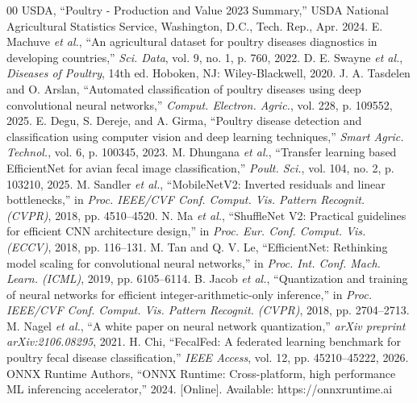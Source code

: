 \documentclass[11pt,a4paper]{article}
\begin{document}
\begin{thebibliography}{00}
 USDA, ``Poultry - Production and Value 2023 Summary,'' USDA National Agricultural Statistics Service, Washington, D.C., Tech. Rep., Apr. 2024.
 E. Machuve \textit{et al.}, ``An agricultural dataset for poultry diseases diagnostics in developing countries,'' \textit{Sci. Data}, vol. 9, no. 1, p. 760, 2022.
 D. E. Swayne \textit{et al.}, \textit{Diseases of Poultry}, 14th ed. Hoboken, NJ: Wiley-Blackwell, 2020.
 J. A. Tasdelen and O. Arslan, ``Automated classification of poultry diseases using deep convolutional neural networks,'' \textit{Comput. Electron. Agric.}, vol. 228, p. 109552, 2025.
 E. Degu, S. Dereje, and A. Girma, ``Poultry disease detection and classification using computer vision and deep learning techniques,'' \textit{Smart Agric. Technol.}, vol. 6, p. 100345, 2023.
 M. Dhungana \textit{et al.}, ``Transfer learning based EfficientNet for avian fecal image classification,'' \textit{Poult. Sci.}, vol. 104, no. 2, p. 103210, 2025.
 M. Sandler \textit{et al.}, ``MobileNetV2: Inverted residuals and linear bottlenecks,'' in \textit{Proc. IEEE/CVF Conf. Comput. Vis. Pattern Recognit. (CVPR)}, 2018, pp. 4510--4520.
 N. Ma \textit{et al.}, ``ShuffleNet V2: Practical guidelines for efficient CNN architecture design,'' in \textit{Proc. Eur. Conf. Comput. Vis. (ECCV)}, 2018, pp. 116--131.
 M. Tan and Q. V. Le, ``EfficientNet: Rethinking model scaling for convolutional neural networks,'' in \textit{Proc. Int. Conf. Mach. Learn. (ICML)}, 2019, pp. 6105--6114.
 B. Jacob \textit{et al.}, ``Quantization and training of neural networks for efficient integer-arithmetic-only inference,'' in \textit{Proc. IEEE/CVF Conf. Comput. Vis. Pattern Recognit. (CVPR)}, 2018, pp. 2704--2713.
 M. Nagel \textit{et al.}, ``A white paper on neural network quantization,'' \textit{arXiv preprint arXiv:2106.08295}, 2021.
 H. Chi, ``FecalFed: A federated learning benchmark for poultry fecal disease classification,'' \textit{IEEE Access}, vol. 12, pp. 45210--45222, 2026.
 ONNX Runtime Authors, ``ONNX Runtime: Cross-platform, high performance ML inferencing accelerator,'' 2024. [Online]. Available: https://onnxruntime.ai
\end{thebibliography}
\end{document}

